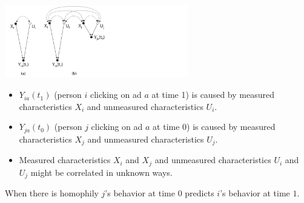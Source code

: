 \documentclass[aspectratio=169]{beamer}
\begin{document}
\begin{frame}

\begin{center}
\includegraphics[width=0.6\textwidth]{figures/bakshy_social_2012_fig1ab}
\end{center}

\begin{itemize}
\item $Y_{ia}(t_1)$ (person $i$ clicking on ad $a$ at time 1) is caused by measured characteristics $X_i$ and unmeasured characteristics $U_i$. \pause
\item $Y_{ja}(t_0)$ (person $j$ clicking on ad $a$ at time 0) is caused by measured characteristics $X_j$ and unmeasured characteristics $U_j$. \pause
\item Measured characteristics $X_i$ and $X_j$ and unmeasured characteristics $U_i$ and $U_j$ might be correlated in unknown ways.
\end{itemize}

When there is homophily $j$'s behavior at time $0$ predicts $i$'s behavior at time $1$.


\end{frame}
\end{document}
